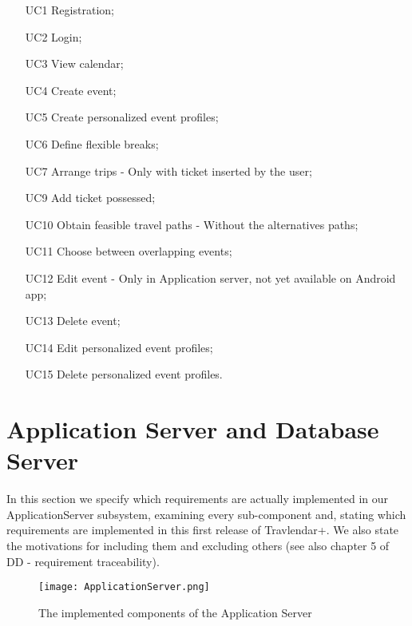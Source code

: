 \begin{itemize}
	\item [UC1] Registration;
	\item [UC2] Login;
	\item [UC3] View calendar;
	\item [UC4] Create event;
	\item [UC5] Create personalized event profiles;
	\item [UC6] Define flexible breaks;
	\item [UC7] Arrange trips - Only with ticket inserted by the user;
	\item [UC9] Add ticket possessed;
	\item [UC10] Obtain feasible travel paths - Without the alternatives paths;
	\item [UC11] Choose between overlapping events;
	\item [UC12] Edit event - Only in Application server, not yet available on Android app; 
	\item [UC13] Delete event;
	\item [UC14] Edit personalized event profiles;
	\item [UC15] Delete personalized event profiles.
\end{itemize}

\section{Application Server and Database Server}
\label{sec:ApplAndDBServers}
In this section we specify which requirements are actually implemented in our ApplicationServer subsystem, examining every sub-component and, stating which requirements are implemented in this first release of Travlendar+. We also state the motivations for including them and excluding others (see also chapter 5 of DD - requirement traceability).
\begin{figure}[H]
	\begin{center}
		\hspace*{-60pt}
		\texttt{[image: ApplicationServer.png]}
	\end{center}
\caption{The implemented components of the Application Server}
\end{figure}

